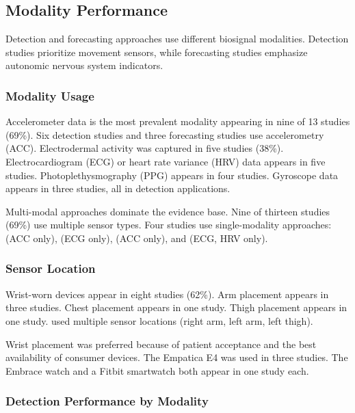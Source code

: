 \subsection{Modality Performance}
\label{sec:modality-performance}

Detection and forecasting approaches use different biosignal modalities. Detection studies prioritize movement sensors, while forecasting studies emphasize autonomic nervous system indicators.

\subsubsection{Modality Usage}

Accelerometer data is the most prevalent modality appearing in nine of 13 studies (69\%). Six detection studies and three forecasting studies use accelerometry (ACC). Electrodermal activity was captured in five studies (38\%). Electrocardiogram (ECG) or heart rate variance (HRV) data appears in five studies. Photoplethysmography (PPG) appears in four studies. Gyroscope data appears in three studies, all in detection applications.

Multi-modal approaches dominate the evidence base. Nine of thirteen studies (69\%) use multiple sensor types. Four studies use single-modality approaches: \textcite{spahrDeepLearningbasedDetection2025} (ACC only), \textcite{reintjesECGBasedDetectionEpileptic2025} (ECG only), \textcite{borujenyDetectionEpilepticSeizure2013} (ACC only), and \textcite{odeDevelopmentEpilepticSeizure2023} (ECG, HRV only).

\subsubsection{Sensor Location}

Wrist-worn devices appear in eight studies (62\%). Arm placement appears in three studies. Chest placement appears in one study. Thigh placement appears in one study. \textcite{borujenyDetectionEpilepticSeizure2013} used multiple sensor locations (right arm, left arm, left thigh).

Wrist placement was preferred because of patient acceptance and the best availability of consumer devices. The Empatica E4 was used in three studies. The Embrace watch and a Fitbit smartwatch both appear in one study each.


\subsubsection{Detection Performance by Modality}

